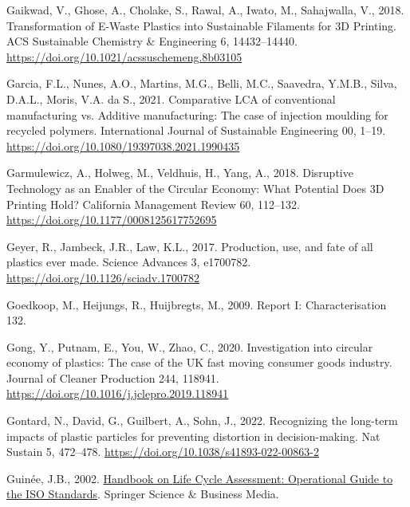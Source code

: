 \documentclass[12pt]{elsarticle} %
\newlength{\cslhangindent}
\newlength{\cslentryspacingunit} %
\newenvironment{CSLReferences}[2] %
 {%
  \setlength{\parindent}{0pt}
  \ifodd #1
  \let\oldpar\par
  \def\par{\hangindent=\cslhangindent\oldpar}
  \fi
  \setlength{\parskip}{#2\cslentryspacingunit}
 }%
 {}
\begin{document}
\begin{CSLReferences}{1}{0}
\leavevmode{}%
Gaikwad, V., Ghose, A., Cholake, S., Rawal, A., Iwato, M., Sahajwalla, V., 2018. Transformation of {E-Waste Plastics} into {Sustainable Filaments} for {3D Printing}. ACS Sustainable Chemistry \& Engineering 6, 14432--14440. \url{https://doi.org/10.1021/acssuschemeng.8b03105}

\leavevmode{}%
Garcia, F.L., Nunes, A.O., Martins, M.G., Belli, M.C., Saavedra, Y.M.B., Silva, D.A.L., Moris, V.A. da S., 2021. Comparative {LCA} of conventional manufacturing vs. Additive manufacturing: The case of injection moulding for recycled polymers. International Journal of Sustainable Engineering 00, 1--19. \url{https://doi.org/10.1080/19397038.2021.1990435}

\leavevmode{}%
Garmulewicz, A., Holweg, M., Veldhuis, H., Yang, A., 2018. Disruptive {Technology} as an {Enabler} of the {Circular Economy}: {What Potential Does 3D Printing Hold}? California Management Review 60, 112--132. \url{https://doi.org/10.1177/0008125617752695}

\leavevmode{}%
Geyer, R., Jambeck, J.R., Law, K.L., 2017. Production, use, and fate of all plastics ever made. Science Advances 3, e1700782. \url{https://doi.org/10.1126/sciadv.1700782}

\leavevmode{}%
Goedkoop, M., Heijungs, R., Huijbregts, M., 2009. Report {I}: {Characterisation} 132.

\leavevmode{}%
Gong, Y., Putnam, E., You, W., Zhao, C., 2020. Investigation into circular economy of plastics: {The} case of the {UK} fast moving consumer goods industry. Journal of Cleaner Production 244, 118941. \url{https://doi.org/10.1016/j.jclepro.2019.118941}

\leavevmode{}%
Gontard, N., David, G., Guilbert, A., Sohn, J., 2022. Recognizing the long-term impacts of plastic particles for preventing distortion in decision-making. Nat Sustain 5, 472--478. \url{https://doi.org/10.1038/s41893-022-00863-2}

\leavevmode{}%
Guinée, J.B., 2002. \href{https://books.google.com?id=Q1VYuV5vc8UC}{Handbook on {Life Cycle Assessment}: {Operational Guide} to the {ISO Standards}}. {Springer Science \& Business Media}.


\end{CSLReferences}
\end{document}
